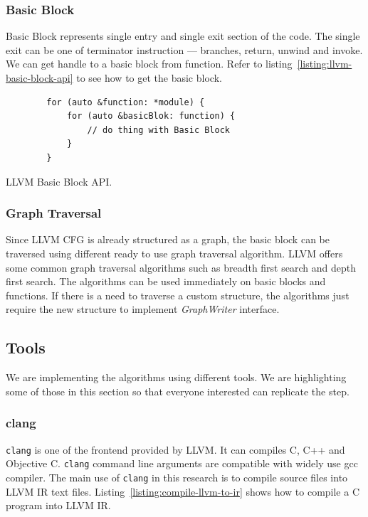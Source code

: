 \subsubsection{Basic Block}

Basic Block represents single entry and single exit section of the code. The
single exit can be one of terminator instruction — branches, return, unwind and
invoke. We can get handle to a basic block from function. Refer to
listing~\ref{listing:llvm-basic-block-api} to see how to get the basic block.

\begin{listing}[htbp]
    \begin{verbatim}
        for (auto &function: *module) {
            for (auto &basicBlok: function) {
                // do thing with Basic Block
            }
        }
    \end{verbatim}
    \caption{LLVM Basic Block API.}    
    \label{listing:llvm-basic-block-api}
\end{listing}

\subsubsection{Graph Traversal}

Since LLVM CFG is already structured as a graph, the basic block can be
traversed using different ready to use graph traversal algorithm. LLVM offers
some common graph traversal algorithms such as breadth first search and depth
first search. The algorithms can be used immediately on basic blocks and
functions. If there is a need to traverse a custom structure, the algorithms
just require the new structure to implement \emph{GraphWriter} interface.

\subsection{Tools}

We are implementing the algorithms using different tools. We are highlighting
some of those in this section so that everyone interested can replicate the
step.

\subsubsection{clang}

\texttt{clang} is one of the frontend provided by LLVM. It can compiles C, C++
and Objective C. \texttt{clang} command line arguments are compatible with
widely use gcc compiler. The main use of \texttt{clang} in this research is to
compile source files into LLVM IR text files.
Listing~\ref{listing:compile-llvm-to-ir} shows how to compile a C program into
LLVM IR. 

